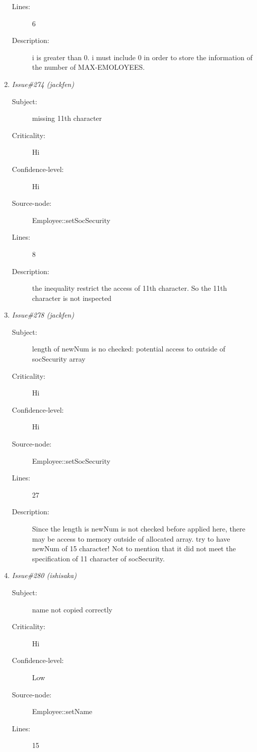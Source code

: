 \begin{enumerate}
\begin{description}
\item [Lines:] 6

\item [Description:] i is greater than 0. i must include 0 in order
to store the information of the number of MAX-EMOLOYEES.
\end{description}
\item {\it Issue\#274 (jackfen)}
\begin{description}
\item [Subject:] missing 11th character
\item [Criticality:] Hi
\item [Confidence-level:] Hi
\item [Source-node:] Employee::setSocSecurity

\item [Lines:] 8

\item [Description:] the inequality restrict the access of 11th
character. So the 11th character is not inspected
\end{description}
\item {\it Issue\#278 (jackfen)}
\begin{description}
\item [Subject:] length of newNum is no checked: potential access
to outside of socSecurity array
\item [Criticality:] Hi
\item [Confidence-level:] Hi
\item [Source-node:] Employee::setSocSecurity

\item [Lines:] 27

\item [Description:] Since the length is newNum is not checked
before applied here, there may be access to memory outside of allocated array.  try to
have newNum of 15 character!  Not to mention that it did not meet the specification of
11 character of socSecurity.
\end{description}
\item {\it Issue\#280 (ishisaka)}
\begin{description}
\item [Subject:] name not copied correctly
\item [Criticality:] Hi
\item [Confidence-level:] Low
\item [Source-node:] Employee::setName

\item [Lines:] 15


\end{description}
\end{enumerate}
